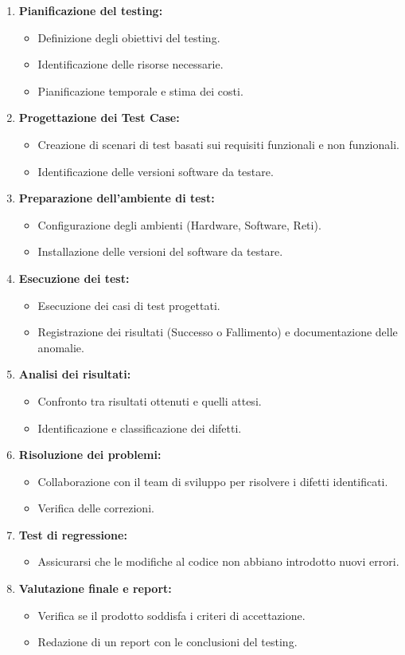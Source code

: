 \documentclass[11pt]{article}
\begin{document}
\begin{enumerate}
\item \textbf{\textbf{Pianificazione del testing:}}
\begin{itemize}
\item Definizione degli obiettivi del testing.
\item Identificazione delle risorse necessarie.
\item Pianificazione temporale e stima dei costi.
\end{itemize}
\item \textbf{\textbf{Progettazione dei Test Case:}}
\begin{itemize}
\item Creazione di scenari di test basati sui requisiti funzionali e non funzionali.
\item Identificazione delle versioni software da testare.
\end{itemize}
\item \textbf{\textbf{Preparazione dell'ambiente di test:}}
\begin{itemize}
\item Configurazione degli ambienti (Hardware, Software, Reti).
\item Installazione delle versioni del software da testare.
\end{itemize}
\item \textbf{\textbf{Esecuzione dei test:}}
\begin{itemize}
\item Esecuzione dei casi di test progettati.
\item Registrazione dei risultati (Successo o Fallimento) e documentazione delle anomalie.
\end{itemize}
\item \textbf{\textbf{Analisi dei risultati:}}
\begin{itemize}
\item Confronto tra risultati ottenuti e quelli attesi.
\item Identificazione e classificazione dei difetti.
\end{itemize}
\item \textbf{\textbf{Risoluzione dei problemi:}}
\begin{itemize}
\item Collaborazione con il team di sviluppo per risolvere i difetti identificati.
\item Verifica delle correzioni.
\end{itemize}
\item \textbf{\textbf{Test di regressione:}}
\begin{itemize}
\item Assicurarsi che le modifiche al codice non abbiano introdotto nuovi errori.
\end{itemize}
\item \textbf{\textbf{Valutazione finale e report:}}
\begin{itemize}
\item Verifica se il prodotto soddisfa i criteri di accettazione.
\item Redazione di un report con le conclusioni del testing.
\end{itemize}
\end{enumerate}
\end{document}
